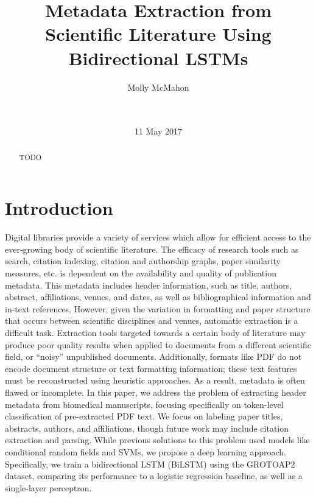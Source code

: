 \documentclass{acm_proc_article-sp}
\begin{document}
\title{Metadata Extraction from Scientific Literature Using Bidirectional LSTMs
}

\author{
\alignauthor
Molly McMahon\\
       \\
       \\
}

\date{11 May 2017}


\maketitle
\begin{abstract}
TODO
\end{abstract}


\section{Introduction}

Digital libraries provide a variety of services which allow for efficient access to the ever-growing body of scientific literature. The efficacy of research tools such as search, citation indexing, citation and authorship graphs, paper similarity measures, etc. is dependent on the availability and quality of publication metadata. This metadata includes header information, such as title, authors, abstract, affiliations, venues, and dates, as well as bibliographical information and in-text references. However, given the variation in formatting and paper structure that occurs between scientific disciplines and venues, automatic extraction is a difficult task. Extraction tools targeted towards a certain body of literature may produce poor quality results when applied to documents from a different scientific field, or “noisy” unpublished documents. Additionally, formats like PDF do not encode document structure or text formatting information; these text features must be reconstructed using heuristic approaches. As a result, metadata is often flawed or incomplete. In this paper, we address the problem of extracting header metadata from biomedical manuscripts, focusing specifically on token-level classification of pre-extracted PDF text. We focus on labeling paper titles, abstracts, authors, and affiliations, though future work may include citation extraction and parsing. While previous solutions to this problem used models like conditional random fields and SVMs, we propose a deep learning approach. Specifically, we train a bidirectional LSTM (BiLSTM) using the GROTOAP2 dataset, comparing its performance to a logistic regression baseline, as well as a single-layer perceptron. 
\end{document}
